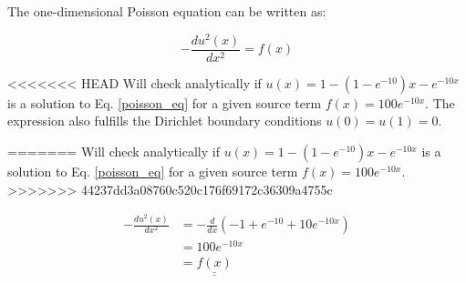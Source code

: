 

The one-dimensional Poisson equation can be written as:

\begin{equation}
   -\frac{du^2(x)}{dx^2} = f(x)
    \label{poisson_eq} 
\end{equation}


<<<<<<< HEAD
Will check analytically if $u(x) = 1 - (1 - e^{-10}) x - e^{-10x} $ is a solution to Eq. \ref{poisson_eq} for a given source term $f(x) = 100e^{-10x}$. The expression also fulfills the Dirichlet boundary conditions $u(0) = u(1) = 0$.

=======
Will check analytically if $u(x) = 1 - (1 - e^{-10}) x - e^{-10x} $ is a solution to Eq. \ref{poisson_eq} for a given source term $f(x) = 100e^{-10x}$.
>>>>>>> 44237dd3a08760c520c176f69172c36309a4755c

\begin{align}
    -\frac{du^2(x)}{dx^2} &= -\frac{d}{dx}(-1 + e^{-10} + 10e^{-10x}) \\
    &= 100e^{-10x} \\
    &= \underline{\underline{f(x)}}
\end{align}